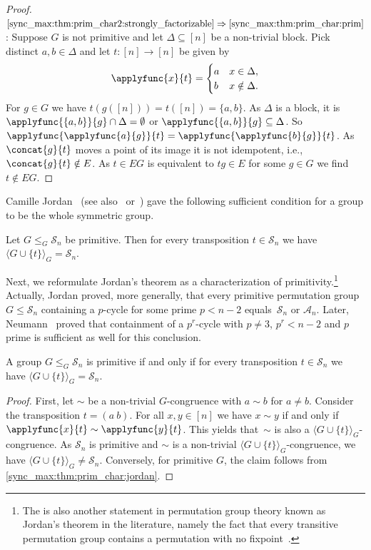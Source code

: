 \begin{proof}
$\ref{sync_max:thm:prim_char2:strongly_factorizable} \Rightarrow \ref{sync_max:thm:prim_char:prim}$:
Suppose $G$ is not primitive and let $\Delta \subseteq [n]$ be a non-trivial block.
Pick distinct $a,b \in \Delta$ and let $t \colon [n] \to [n]$
be given by
\[ 
\applyfunc{x}{t} = \begin{cases} 
	a  & x \in \Delta, \\
	b  & x \notin \Delta.
\end{cases}
\] 
For $g \in G$
we have $t(g([n])) = t([n]) = \{a,b\}$.
As $\Delta$ is a block, it is $\applyfunc{\{a,b\}}{g} \cap \Delta = \emptyset$
or $\applyfunc{\{a,b\}}{g} \subseteq \Delta$.
So  $\applyfunc{\applyfunc{a}{g}}{t} = \applyfunc{\applyfunc{b}{g}}{t}$.
As $\concat{g}{t}$ moves a point of its image it is
not idempotent, i.e., $\concat{g}{t} \notin E$.
As $t \in EG$ is equivalent to $tg \in E$ for some $g \in G$
we find $t \notin EG$.
\end{proof}

Camille Jordan~\cite{jordan1870} (see also~\cite[Lem.~6]{AraujoCameron2014} 
or~\cite[Thm.~8.7]{isaacs2008}) gave the following sufficient condition for a group to be the whole symmetric group.

\begin{theorem}
\label{sync_max:thm:prim_char:jordan} 
	Let $G \le_G \mathcal S_n$ be primitive.
	Then for every transposition $t \in \mathcal S_n$ we
	have $\langle G \cup \{t\} \rangle_G = \mathcal S_n$.
\end{theorem} 

Next, we reformulate Jordan's theorem as a characterization of primitivity.\footnote{The is also another
	statement in permutation group theory known as Jordan's theorem in the literature, namely the fact that every transitive permutation group
	contains a permutation with no fixpoint~\cite{Serre03}.}
Actually, Jordan
proved, more generally, that every primitive permutation group $G \le \mathcal S_n$
containing a $p$-cycle for some prime $p < n - 2$ equals~$\mathcal S_n$ or $\mathcal A_n$.
Later, Neumann~\cite{neumann75} proved that containment of a $p^r$-cycle 
with $p \ne 3$, $p^r < n - 2$ and $p$ prime is sufficient as well for this conclusion.

\begin{corollary}
		A group $G \le_G \mathcal S_n$ is primitive
		if and only if for every transposition $t \in \mathcal S_n$ we
		have $\langle G \cup \{t\} \rangle_G = \mathcal S_n$.
\end{corollary}
\begin{proof}
	First, let $\sim$ be a non-trivial $G$-congruence with $a \sim b$ for $a \ne b$.
	Consider the transposition $t = (a ~ b)$. 
	For all $x,y \in [n]$ we have $x \sim y$ if and only if $\applyfunc{x}{t} \sim \applyfunc{y}{t}$. 
	This yields that~$\sim$ is also a $\langle G \cup \{t\} \rangle_G$-congruence.
	As $\mathcal S_n$ is primitive
	and $\sim$ is a non-trivial $\langle G \cup \{t\} \rangle_G$-congruence,
	we have $\langle G \cup \{t\} \rangle_G \ne \mathcal S_n$.	 
	Conversely, for primitive $G$, 
	the claim follows from \cref{sync_max:thm:prim_char:jordan}.
\end{proof} 

